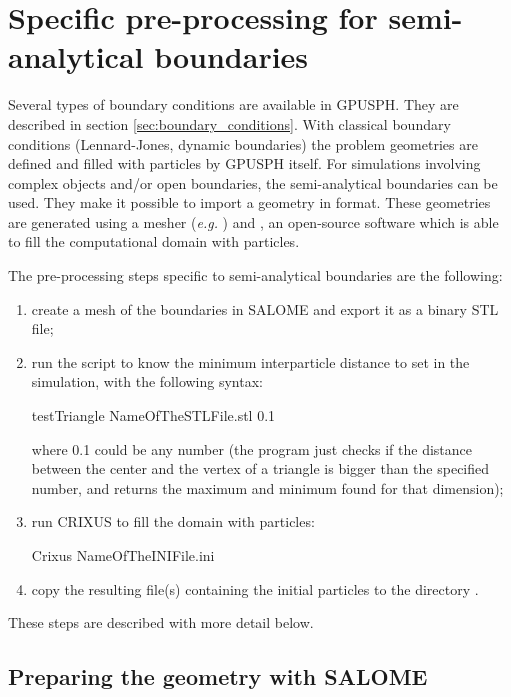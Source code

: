 \section{Specific pre-processing for semi-analytical boundaries}\label{sec:preprocess_sa}

Several types of boundary conditions are available in GPUSPH. 
They are described in section \ref{sec:boundary_conditions}.
With classical boundary conditions (Lennard-Jones, dynamic boundaries) the problem 
geometries are defined and filled with particles by GPUSPH itself.
For simulations involving complex objects and/or open boundaries, 
the semi-analytical boundaries can be used. They make it possible 
to import a geometry in  format. These geometries are 
generated using a mesher (\textit{e.g.} ) and ,
an open-source software which is able to fill the computational 
domain with particles. 

The pre-processing steps specific to semi-analytical boundaries 
are the following:
\begin{enumerate}
\item create a mesh of the boundaries in SALOME and 
export it as a binary STL file;
\item run the  script to know the 
minimum interparticle distance to set in the simulation, 
with the following syntax:
\begin{shellcode}
testTriangle NameOfTheSTLFile.stl 0.1
\end{shellcode}
where 0.1 could be any number (the program just checks if 
the distance between the center and the vertex of a 
triangle is bigger than the specified number, and returns 
the maximum and minimum found for that dimension);
\item run CRIXUS to fill the domain with particles:
\begin{shellcode}
Crixus NameOfTheINIFile.ini
\end{shellcode}
\item copy the resulting  file(s) containing 
the initial particles to the directory .
\end{enumerate}

These steps are described with more detail below.

\subsection{Preparing the geometry with SALOME}

